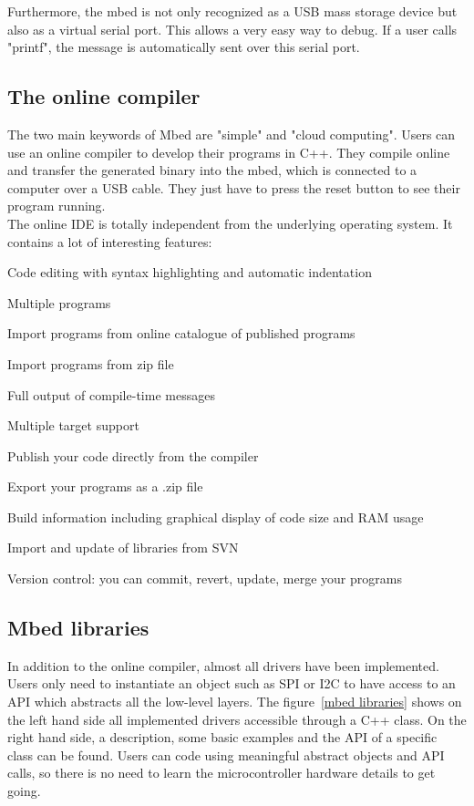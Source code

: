 \documentclass[pdftex,10pt,a4paper]{report}
\newenvironment{packed_item}{
\begin{itemize}
  \setlength{\itemsep}{1pt}
  \setlength{\parskip}{0pt}
  \setlength{\parsep}{0pt}
}{\end{itemize}}
\begin{document}
Furthermore, the mbed is not only recognized as a USB mass storage device but also as a virtual serial port. This allows a very easy way to debug. If a user calls "printf", the message is automatically sent over this serial port.


\subsection{The online compiler}
The two main keywords of Mbed are "simple" and "cloud computing". Users can use an online compiler to develop their programs in C++. They compile online and transfer the generated binary into the mbed, which is connected to a computer over a USB cable. They just have to press the reset button to see their program running.
\\

The online IDE is totally independent from the underlying operating system. It contains a lot of interesting features:
\begin{packed_item}
	\item Code editing with syntax highlighting and automatic indentation
	\item Multiple programs
	\item Import programs from online catalogue of published programs
	\item Import programs from zip file
	\item Full output of compile-time messages
	\item Multiple target support
	\item Publish your code directly from the compiler
	\item Export your programs as a .zip file
	\item Build information including graphical display of code size and RAM usage
	\item Import and update of libraries from SVN
	\item Version control: you can commit, revert, update, merge your programs
\end{packed_item}

\subsection{Mbed libraries}
In addition to the online compiler, almost all drivers have been implemented. Users only need to instantiate an object such as SPI or I2C to have access to an API which abstracts all the low-level layers. The figure~\ref{mbed libraries} shows on the left hand side all implemented drivers accessible through a C++ class. On the right hand side, a description, some basic examples and the API of a specific class can be found. Users can code using meaningful abstract objects and API calls, so there is no need to learn the microcontroller hardware details to get going.\\
\end{document}
